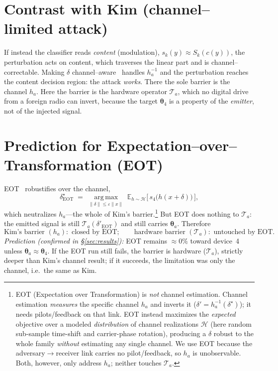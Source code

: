 \documentclass[11pt]{article}
\newcommand{\Top}[1]{\mathcal{T}_{#1}}          %
\newcommand{\ba}{\bm{\theta}}
\newcommand{\argmax}{\operatorname*{arg\,max}}
\begin{document}
\section{Contrast with Kim (channel--limited attack)}
If instead the classifier reads \emph{content} (modulation),
$s_k(y)\approx S_k(c(y))$, the perturbation acts on content, which traverses the
linear part and is channel--correctable. Making $\delta$ channel--aware~\cite{kim} handles
$h_a^{-1}$ and the perturbation reaches the content decision region: the attack
\emph{works}. There the sole barrier is the channel $h_a$. Here the barrier is the
hardware operator $\Top{a}$, which no digital drive from a foreign radio can invert,
because the target $\ba_4$ is a property of the \emph{emitter}, not of the injected
signal.

\section{Prediction for Expectation--over--Transformation (EOT)}
EOT~\cite{athalye} robustifies over the channel,
\begin{equation}
\delta^\star_{\mathrm{EOT}} \;=\; \argmax_{\|\delta\|\le\varepsilon\|x\|}\;
\mathbb{E}_{h\sim\mathcal{H}}\big[\, s_4\big(h(x+\delta)\big)\,\big],
\end{equation}
which neutralizes $h_a$---the whole of Kim's barrier.\footnote{EOT (Expectation over
Transformation) is \emph{not} channel estimation. Channel estimation \emph{measures} the
specific channel $h_a$ and inverts it ($\delta'=h_a^{-1}(\delta^\star)$); it needs
pilots/feedback on that link. EOT instead maximizes the \emph{expected} objective over a
modeled \emph{distribution} of channel realizations $\mathcal{H}$ (here random sub-sample
time-shift and carrier-phase rotation), producing a $\delta$ robust to the whole family
\emph{without} estimating any single channel. We use EOT because the adversary$\to$receiver
link carries no pilot/feedback, so $h_a$ is unobservable. Both, however, only address
$h_a$; neither touches $\Top{a}$.} But EOT does nothing to
$\Top{a}$: the emitted signal is still $\Top{a}(\delta'_{\mathrm{EOT}})$ and still
carries $\ba_a$. Therefore
\begin{equation}
\text{Kim's barrier } (h_a): \text{ closed by EOT}; \qquad
\text{hardware barrier } (\Top{a}): \text{ untouched by EOT}.
\end{equation}
\emph{Prediction (confirmed in \S\ref{sec:results}):} EOT remains $\approx 0\%$ toward
device~4 unless $\ba_a\approx\ba_4$. If the EOT run still fails, the barrier is hardware
($\Top{a}$), strictly deeper than Kim's channel result; if it succeeds, the limitation
was only the channel, i.e.\ the same as Kim.
\end{document}
